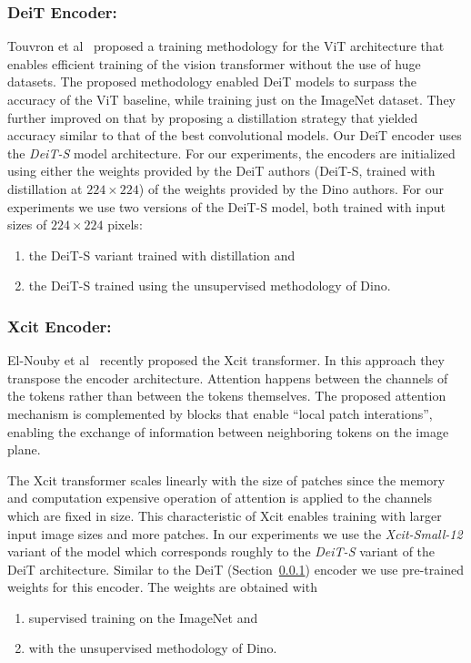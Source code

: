 \documentclass[runningheads]{llncs}
\begin{document}
\subsubsection{DeiT Encoder:}
\label{sec:deit}
Touvron et al~\cite{touvron2021training} proposed a training methodology for the ViT architecture 
that enables efficient training of the vision transformer without the use of huge datasets.
The proposed methodology enabled DeiT models to surpass the accuracy of the 
ViT baseline, while training just on the ImageNet dataset.
They further improved on that by proposing a distillation strategy that yielded accuracy 
similar to that of the best convolutional models.
Our DeiT encoder uses the \emph{DeiT-S} model architecture. For our experiments, the encoders are initialized using either the weights provided by the DeiT authors (DeiT-S, trained with distillation at $224 \times 224$) of the weights provided by the Dino authors.
For our experiments we use two versions of the DeiT-S model, both trained with 
input sizes of $224 \times 224$ pixels:
\begin{enumerate}
\item
the DeiT-S variant trained with distillation and
\item
the DeiT-S trained using the unsupervised methodology of Dino.
\end{enumerate}

\subsubsection{Xcit Encoder:}
El-Nouby et al~\cite{el2021xcit} recently proposed the Xcit transformer. 
In this approach they transpose the encoder architecture. 
Attention happens between the channels of the tokens rather than between
the tokens themselves. The proposed attention mechanism is complemented by 
blocks that enable ``local patch interations'', enabling the exchange of information 
between neighboring tokens on the image plane.

The Xcit transformer scales linearly with the size of patches since the 
memory and computation expensive operation of attention is applied to the channels 
which are fixed in size. This characteristic of Xcit enables training with larger input image sizes and more patches. In our experiments we use the \emph{Xcit-Small-12} variant of the model
which corresponds roughly to the \emph{DeiT-S} variant of the DeiT architecture.
Similar to the DeiT (Section~\ref{sec:deit}) encoder we use pre-trained weights for this 
encoder. The weights are obtained with 
\begin{enumerate}
\item
supervised training on the ImageNet and 
\item
with the unsupervised methodology of Dino.
\end{enumerate}
\end{document}
